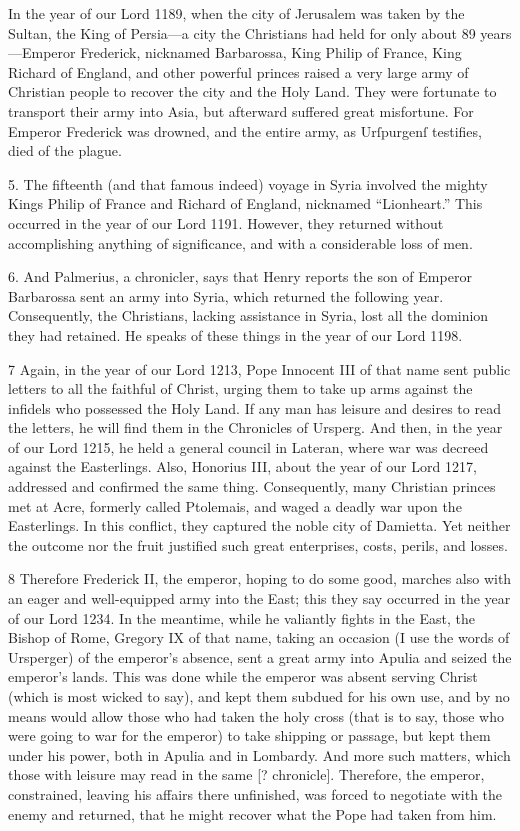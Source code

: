 In the year of our Lord 1189, when the city of Jerusalem was taken by the Sultan, the King of Persia—a city the Christians had held for only about 89 years—Emperor Frederick, nicknamed Barbarossa, King Philip of France, King Richard of England, and other powerful princes raised a very large army of Christian people to recover the city and the Holy Land. They were fortunate to transport their army into Asia, but afterward suffered great misfortune. For Emperor Frederick was drowned, and the entire army, as Urſpurgenſ testifies, died of the plague.

5. The fifteenth (and that famous indeed) voyage in Syria involved the mighty Kings Philip of France and Richard of England, nicknamed “Lionheart.” This occurred in the year of our Lord 1191. However, they returned without accomplishing anything of significance, and with a considerable loss of men.

6. And Palmerius, a chronicler, says that Henry reports the son of Emperor Barbarossa sent an army into Syria, which returned the following year. Consequently, the Christians, lacking assistance in Syria, lost all the dominion they had retained. He speaks of these things in the year of our Lord 1198.

7 Again, in the year of our Lord 1213, Pope Innocent III of that name sent public letters to all the faithful of Christ, urging them to take up arms against the infidels who possessed the Holy Land. If any man has leisure and desires to read the letters, he will find them in the Chronicles of Ursperg. And then, in the year of our Lord 1215, he held a general council in Lateran, where war was decreed against the Easterlings. Also, Honorius III, about the year of our Lord 1217, addressed and confirmed the same thing. Consequently, many Christian princes met at Acre, formerly called Ptolemais, and waged a deadly war upon the Easterlings. In this conflict, they captured the noble city of Damietta. Yet neither the outcome nor the fruit justified such great enterprises, costs, perils, and losses.

8 Therefore Frederick II, the emperor, hoping to do some good, marches also with an eager and well-equipped army into the East; this they say occurred in the year of our Lord 1234. In the meantime, while he valiantly fights in the East, the Bishop of Rome, Gregory IX of that name, taking an occasion (I use the words of Ursperger) of the emperor’s absence, sent a great army into Apulia and seized the emperor’s lands. This was done while the emperor was absent serving Christ (which is most wicked to say), and kept them subdued for his own use, and by no means would allow those who had taken the holy cross (that is to say, those who were going to war for the emperor) to take shipping or passage, but kept them under his power, both in Apulia and in Lombardy. And more such matters, which those with leisure may read in the same [? chronicle]. Therefore, the emperor, constrained, leaving his affairs there unfinished, was forced to negotiate with the enemy and returned, that he might recover what the Pope had taken from him.

